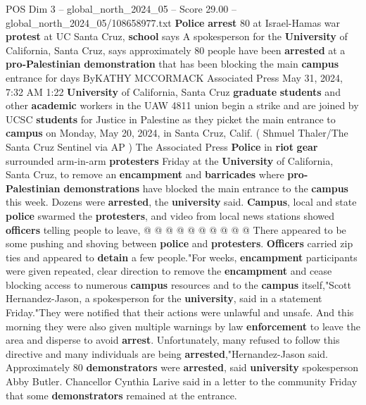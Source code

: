 \begin{textsample}{POS Dim 3 – global\_north\_2024\_05 – Score 29.00 – global\_north\_2024\_05/108658977.txt}  \label{ex:f3_pos_002}
\textbf{Police} \textbf{arrest} 80 at Israel-Hamas war \textbf{protest} at UC Santa Cruz, \textbf{school} says A spokesperson for the \textbf{University} of California, Santa Cruz, says approximately 80 people have been \textbf{arrested} at a \textbf{pro-Palestinian} \textbf{demonstration} that has been blocking the main \textbf{campus} entrance for days ByKATHY MCCORMACK Associated Press May 31, 2024, 7:32 AM 1:22 \textbf{University} of California, Santa Cruz \textbf{graduate} \textbf{students} and other \textbf{academic} workers in the UAW 4811 union begin a strike and are joined by UCSC \textbf{students} for Justice in Palestine as they picket the main entrance to \textbf{campus} on Monday, May 20, 2024, in Santa Cruz, Calif. ( Shmuel Thaler/The Santa Cruz Sentinel via AP ) The Associated Press \textbf{Police} in \textbf{riot} \textbf{gear} surrounded arm-in-arm \textbf{protesters} Friday at the \textbf{University} of California, Santa Cruz, to remove an \textbf{encampment} and \textbf{barricades} where \textbf{pro-Palestinian} \textbf{demonstrations} have blocked the main entrance to the \textbf{campus} this week.
Dozens were \textbf{arrested}, the \textbf{university} said. \textbf{Campus}, local and state \textbf{police} swarmed the \textbf{protesters}, and video from local news stations showed \textbf{officers} telling people to leave, @ @ @ @ @ @ @ @ @ @ There appeared to be some pushing and shoving between \textbf{police} and \textbf{protesters}. \textbf{Officers} carried zip ties and appeared to \textbf{detain} a few people."For weeks, \textbf{encampment} participants were given repeated, clear direction to remove the \textbf{encampment} and cease blocking access to numerous \textbf{campus} resources and to the \textbf{campus} itself,"Scott Hernandez-Jason, a spokesperson for the \textbf{university}, said in a statement Friday."They were notified that their actions were unlawful and unsafe.
And this morning they were also given multiple warnings by law \textbf{enforcement} to leave the area and disperse to avoid \textbf{arrest}.
Unfortunately, many refused to follow this directive and many individuals are being \textbf{arrested},"Hernandez-Jason said.
Approximately 80 \textbf{demonstrators} were \textbf{arrested}, said \textbf{university} spokesperson Abby Butler.
Chancellor Cynthia Larive said in a letter to the community Friday that some \textbf{demonstrators} remained at the entrance.

\end{textsample}
